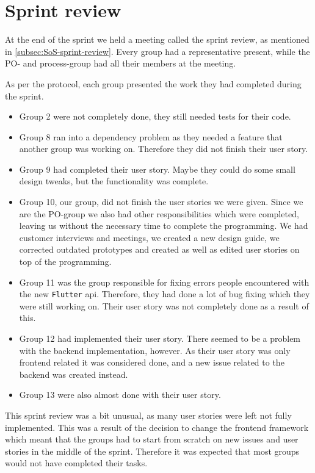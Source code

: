 \section{Sprint review}

At the end of the sprint we held a meeting called the sprint review, as mentioned in \ref{subsec:SoS-sprint-review}.
Every group had a representative present, while the PO- and process-group had all their members at the meeting.

As per the protocol, each group presented the work they had completed during the sprint.
\begin{itemize}
    \item Group 2 were not completely done, they still needed tests for their code.
    \item Group 8 ran into a dependency problem as they needed a feature that another group was working on. Therefore they did not finish their user story.
    \item Group 9 had completed their user story. Maybe they could do some small design tweaks, but the functionality was complete.
    \item Group 10, our group, did not finish the user stories we were given. Since we are the PO-group we also had other responsibilities which were completed, leaving us without the necessary time to complete the programming. We had customer interviews and meetings, we created a new design guide, we corrected outdated prototypes and created as well as edited user stories on top of the programming.
    \item Group 11 was the group responsible for fixing errors people encountered with the new \texttt{Flutter} api. Therefore, they had done a lot of bug fixing which they were still working on. Their user story was not completely done as a result of this.
    \item Group 12 had implemented their user story. There seemed to be a problem with the backend implementation, however. As their user story was only frontend related it was considered done, and a new issue related to the backend was created instead.
    \item Group 13 were also almost done with their user story.
\end{itemize}

This sprint review was a bit unusual, as many user stories were left not fully implemented. This was a result of the decision to change the frontend framework which meant that the groups had to start from scratch on new issues and user stories in the middle of the sprint.
Therefore it was expected that most groups would not have completed their tasks.

